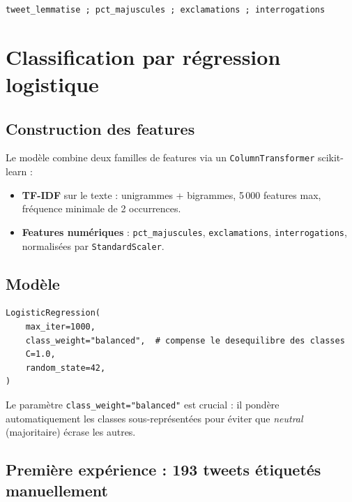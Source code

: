 \documentclass[12pt, a4paper]{article}
\begin{document}
\begin{center}
\texttt{tweet\_lemmatise ;\ pct\_majuscules ;\ exclamations ;\ interrogations}
\end{center}

\section{Classification par régression logistique}

\subsection{Construction des features}

Le modèle combine deux familles de features via un \texttt{ColumnTransformer} scikit-learn :

\begin{itemize}
    \item \textbf{TF-IDF} sur le texte : unigrammes + bigrammes, 5\,000 features max,
          fréquence minimale de 2 occurrences.
    \item \textbf{Features numériques} : \texttt{pct\_majuscules}, \texttt{exclamations},
          \texttt{interrogations}, normalisées par \texttt{StandardScaler}.
\end{itemize}

\subsection{Modèle}

\begin{lstlisting}
LogisticRegression(
    max_iter=1000,
    class_weight="balanced",  # compense le desequilibre des classes
    C=1.0,
    random_state=42,
)
\end{lstlisting}

Le paramètre \texttt{class\_weight="balanced"} est crucial : il pondère automatiquement
les classes sous-représentées pour éviter que \textit{neutral} (majoritaire) écrase les autres.

\subsection{Première expérience : 193 tweets étiquetés manuellement}
\end{document}
